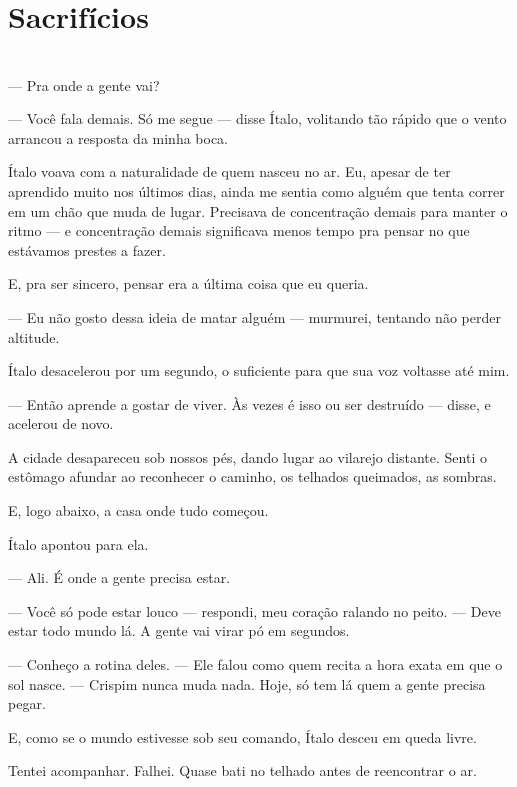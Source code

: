 \newpage

\ifdefined\useChapters
\chapter{Sacrifícios}
\else
\chapter{}
\fi

— Pra onde a gente vai?

— Você fala demais. Só me segue — disse Ítalo, volitando tão rápido que o vento arrancou a resposta da minha boca.

Ítalo voava com a naturalidade de quem nasceu no ar.  
Eu, apesar de ter aprendido muito nos últimos dias, ainda me sentia como alguém que tenta correr em um chão que muda de lugar.  
Precisava de concentração demais para manter o ritmo — e concentração demais significava menos tempo pra pensar no que estávamos prestes a fazer.

E, pra ser sincero, pensar era a última coisa que eu queria.

— Eu não gosto dessa ideia de matar alguém — murmurei, tentando não perder altitude.

Ítalo desacelerou por um segundo, o suficiente para que sua voz voltasse até mim.

— Então aprende a gostar de viver. Às vezes é isso ou ser destruído — disse, e acelerou de novo.

A cidade desapareceu sob nossos pés, dando lugar ao vilarejo distante.  
Senti o estômago afundar ao reconhecer o caminho, os telhados queimados, as sombras.

E, logo abaixo, a casa onde tudo começou.

Ítalo apontou para ela.

— Ali. É onde a gente precisa estar.

— Você só pode estar louco — respondi, meu coração ralando no peito. — Deve estar todo mundo lá. A gente vai virar pó em segundos.

— Conheço a rotina deles. — Ele falou como quem recita a hora exata em que o sol nasce. — Crispim nunca muda nada. Hoje, só tem lá quem a gente precisa pegar.

E, como se o mundo estivesse sob seu comando, Ítalo desceu em queda livre.

Tentei acompanhar.  
Falhei.  
Quase bati no telhado antes de reencontrar o ar.

